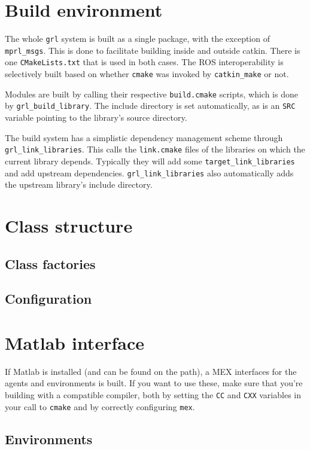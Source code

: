 \documentclass{article}
\newcommand{\txt}[1]{\texttt{#1}}
\begin{document}
\section{Build environment}

The whole \txt{grl} system is built as a single package, with the exception
of \txt{mprl\_msgs}. This is done to facilitate building inside and outside
catkin. There is one \txt{CMakeLists.txt} that is used in both cases. The
ROS interoperability is selectively built based on whether \txt{cmake} was invoked by
\txt{catkin\_make} or not.

Modules are built by calling their respective \txt{build.cmake} scripts,
which is done by \txt{grl\_build\_library}. The include directory is set
automatically, as is an \txt{SRC} variable pointing to the library's source
directory.

The build system has a simplistic dependency management scheme through
\txt{grl\_link\_libraries}. This calls the \txt{link.cmake} files of the
libraries on which the current library depends. Typically they will add some
\txt{target\_link\_libraries} and add upstream dependencies.
\txt{grl\_link\_libraries} also automatically adds the upstream library's
include directory.

\section{Class structure}

\subsection{Class factories}

\subsection{Configuration}

\section{Matlab interface}

If Matlab is installed (and can be found on the path), a MEX interfaces for
the agents and environments is built. If you want to use these, make sure
that you're building with a compatible compiler, both by setting the
\txt{CC} and \txt{CXX} variables in your call to \txt{cmake} and by correctly
configuring \txt{mex}.

\subsection{Environments}
\end{document}
